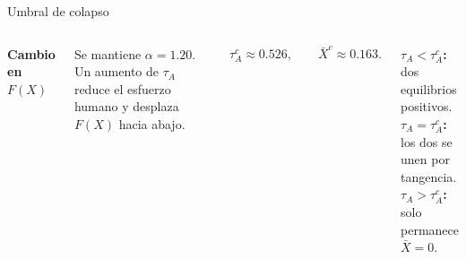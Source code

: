 \documentclass[aspectratio=169,11pt]{beamer}
\newcommand{\azul}[1]{\textcolor{AzulMedio}{\textbf{#1}}}
\begin{document}
\begin{frame}{Umbral de colapso}
\begin{columns}[T,onlytextwidth]
{\small\azul{Cambio en $F(X)$}}

{\scriptsize Se mantiene $\alpha=1.20$. Un aumento de $\tau_A$ reduce el esfuerzo humano y desplaza $F(X)$ hacia abajo.}

\vspace{0.05cm}
{\small
\[
\tau_A^c\approx0.526,
\qquad \bar X^c\approx0.163.
\]}

{\scriptsize
\textbf{$\tau_A<\tau_A^c$:} dos equilibrios positivos.\\[0.08cm]
\textbf{$\tau_A=\tau_A^c$:} los dos se unen por tangencia.\\[0.08cm]
\textbf{$\tau_A>\tau_A^c$:} solo permanece $\bar X=0$.
}
\end{columns}
\end{frame}

\end{document}
